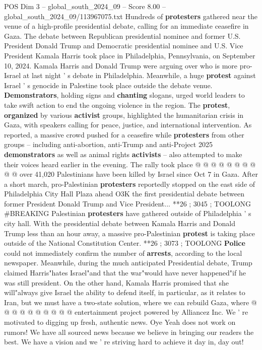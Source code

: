 \begin{textsample}{POS Dim 3 – global\_south\_2024\_09 – Score 8.00 – global\_south\_2024\_09/113967075.txt}  \label{ex:f3_pos_324}
Hundreds of \textbf{protesters} gathered near the venue of a high-profile presidential debate, calling for an immediate ceasefire in Gaza.
The debate between Republican presidential nominee and former U.S.
President Donald Trump and Democratic presidential nominee and U.S.
Vice President Kamala Harris took place in Philadelphia, Pennsylvania, on September 10, 2024.
Kamala Harris and Donald Trump were arguing over who is more pro-Israel at last night ' s debate in Philadelphia.
Meanwhile, a huge \textbf{protest} against Israel ' s genocide in Palestine took place outside the debate venue. \textbf{Demonstrators}, holding signs and \textbf{chanting} slogans, urged world leaders to take swift action to end the ongoing violence in the region.
The \textbf{protest}, \textbf{organized} by various \textbf{activist} groups, highlighted the humanitarian crisis in Gaza, with speakers calling for peace, justice, and international intervention.
As reported, a massive crowd pushed for a ceasefire while \textbf{protesters} from other groups -- including anti-abortion, anti-Trump and anti-Project 2025 \textbf{demonstrators} as well as animal rights \textbf{activists} -- also attempted to make their voices heard earlier in the evening.
The rally took place @ @ @ @ @ @ @ @ @ @ over 41,020 Palestinians have been killed by Israel since Oct 7 in Gaza.
After a short march, pro-Palestinian \textbf{protesters} reportedly stopped on the east side of Philadelphia City Hall Plaza ahead O3K the first presidential debate between former President Donald Trump and Vice President... **26 ; 3045 ; TOOLONG \#BREAKING Palestinian \textbf{protesters} have gathered outside of Philadelphia ' s city hall.
With the presidential debate between Kamala Harris and Donald Trump less than an hour away, a massive pro-Palestinian \textbf{protest} is taking place outside of the National Constitution Center. **26 ; 3073 ; TOOLONG \textbf{Police} could not immediately confirm the number of \textbf{arrests}, according to the local newspaper.
Meanwhile, during the much anticipated Presidential debate, Trump claimed Harris"hates Israel"and that the war"would have never happened"if he was still president.
On the other hand, Kamala Harris promised that she will"always give Israel the ability to defend itself, in particular, as it relates to Iran, but we must have a two-state solution, where we can rebuild Gaza, where @ @ @ @ @ @ @ @ @ @ entertainment project powered by Alliancez Inc.
We ' re motivated to digging up fresh, authentic news.
Oye Yeah does not work on rumors!
We have all sourced news because we believe in bringing our readers the best.
We have a vision and we ' re striving hard to achieve it day in, day out!

\end{textsample}
